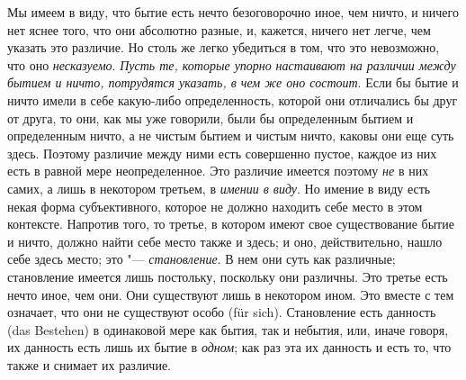 Мы имеем в виду, что бытие есть нечто безоговорочно иное, чем ничто, и
ничего нет яснее того, что они абсолютно разные, и, кажется, ничего нет
легче, чем указать это различие. Но столь же легко убедиться в том, что это
невозможно, что оно {\em несказуемо}.
{\em Пусть те, которые упорно}
{\em настаивают на различии между бытием и ничто,
потрудятся указать, в чем же оно состоит}. Если бы бытие и ничто имели в
себе какую-либо определенность, которой они отличались бы друг от друга, то
они, как мы уже говорили, были бы определенным бытием и определенным ничто,
а не чистым бытием и чистым ничто, каковы они еще суть здесь. Поэтому
различие между ними есть совершенно пустое, каждое из них есть в равной
мере неопределенное. Это различие имеется поэтому
{\em не} в них самих, а лишь в некотором третьем, в
{\em имении в виду}. Но имение в виду есть некая форма
субъективного, которое не должно находить себе место в этом контексте.
Напротив того, то третье, в котором имеют свое существование бытие и ничто,
должно найти себе место также и здесь; и оно, действительно, нашло себе
здесь место; это "--- {\em становление}. В нем они суть
как различные; становление имеется лишь постольку, поскольку они различны.
Это третье есть нечто иное, чем они. Они существуют лишь в некотором
ином. Это вместе с тем означает, что они не существуют особо (für sich).
Становление есть данность (das Bestehen) в одинаковой мере как бытия, так и
небытия, или, иначе говоря, их данность есть лишь их бытие в
{\em одном}; как раз эта их данность и есть то, что
также и снимает их различие.


